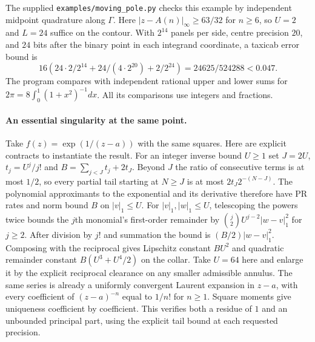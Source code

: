 The supplied \texttt{examples/moving\_pole.py} checks this example by independent midpoint quadrature along $\Gamma$. Here $|z-A(n)|_\infty\ge63/32$ for $n\ge6$, so $U=2$ and $L=24$ suffice on the contour. With $2^{14}$ panels per side, centre precision $20$, and $24$ bits after the binary point in each integrand coordinate, a taxicab error bound is
\[
 16\left(24\cdot2/2^{14}+24/(4\cdot2^{20})+2/2^{24}\right)
 =24625/524288<0.047 .
\]
The program compares with independent rational upper and lower sums for $2\pi=8\int_0^1(1+x^2)^{-1}dx$. All its comparisons use integers and fractions.

\paragraph{An essential singularity at the same point.}
Take $f(z)=\exp(1/(z-a))$ with the same squares. Here are explicit contracts to instantiate the result. For an integer inverse bound $U\ge1$ set $J=2U$, $t_j=U^j/j!$ and $B=\sum_{j<J}t_j+2t_J$. Beyond $J$ the ratio of consecutive terms is at most $1/2$, so every partial tail starting at $N\ge J$ is at most $2t_J2^{-(N-J)}$. The polynomial approximants to the exponential and its derivative therefore have PR rates and norm bound $B$ on $|v|_1\le U$. For $|v|_1,|w|_1\le U$, telescoping the powers twice bounds the $j$th monomial's first-order remainder by $\binom j2 U^{j-2}|w-v|_1^2$ for $j\ge2$. After division by $j!$ and summation the bound is $(B/2)|w-v|_1^2$. Composing with the reciprocal gives Lipschitz constant $BU^2$ and quadratic remainder constant $B(U^3+U^4/2)$ on the collar. Take $U=64$ here and enlarge it by the explicit reciprocal clearance on any smaller admissible annulus. The same series is already a uniformly convergent Laurent expansion in $z-a$, with every coefficient of $(z-a)^{-n}$ equal to $1/n!$ for $n\ge1$. Square moments give uniqueness coefficient by coefficient. This verifies both a residue of $1$ and an unbounded principal part, using the explicit tail bound at each requested precision.

